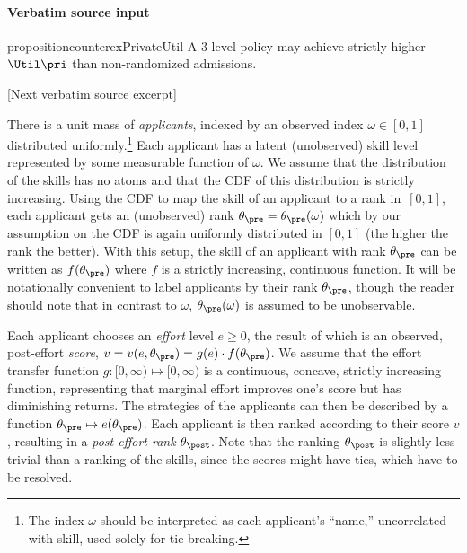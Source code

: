 \documentclass[10pt]{article}
\begin{document}
\paragraph{Verbatim source input}
\begin{ReviewVerbatim}
\begin{restatable}[]{proposition}{counterexPrivateUtil}\label{prop-counterex-priv-util}
	 A $3$-level policy may achieve strictly higher $\Util\pri$ than non-randomized admissions.
\end{restatable}

[Next verbatim source excerpt]

There is a unit mass of \textit{applicants}, indexed by an observed index $\omega \in [0,1]$ distributed uniformly.\footnote{The index $\omega$ should be interpreted as each applicant's ``name,'' uncorrelated with skill, used solely for tie-breaking.}  Each applicant has a latent (unobserved) skill level represented by some measurable function of $\omega$.
We assume that {the distribution of the skills} has no atoms and that the CDF of this distribution is strictly increasing.
Using the CDF to map the skill of an applicant to a rank in~$[0,1]$, each applicant gets an (unobserved) rank $\theta_\pre =\theta_\pre(\omega)$ which by our assumption on the CDF is again uniformly distributed in $[0, 1]$ (the higher the rank the better).  With this setup, the skill of an applicant with rank $\theta_\pre$ can be written as $f(\theta_\pre)$ where $f$ is a strictly increasing, continuous function.  {It will be notationally convenient to label applicants by their rank $\theta_\pre$, though the reader should note that in contrast to $\omega$, $\theta_\pre(\omega)$ is assumed to be unobservable.}



Each applicant chooses an \textit{effort} level $e \ge 0$, the result of which is an observed, post-effort \textit{score}, {$v=v(e,\theta_\pre) = {g(e)}\cdot{f(\theta_\pre)}$}. 
{We assume} that the effort transfer function $g: [0, \infty) \mapsto [0, \infty)$ is a continuous, concave, strictly increasing function, representing that marginal effort improves one's score but has diminishing returns.
{%
{T}he strategies of the applicants can {then} be described by a function $\theta_\pre \mapsto e(\theta_\pre)$.
}
  Each {applicant} is then ranked according to their score $v$%
, resulting in a \textit{post-effort rank} $\theta_\post$.
Note that the ranking $\theta_\post$ is slightly less trivial than a ranking of the skills, since the scores might have ties, which have to be resolved.


\end{ReviewVerbatim}
\end{document}
